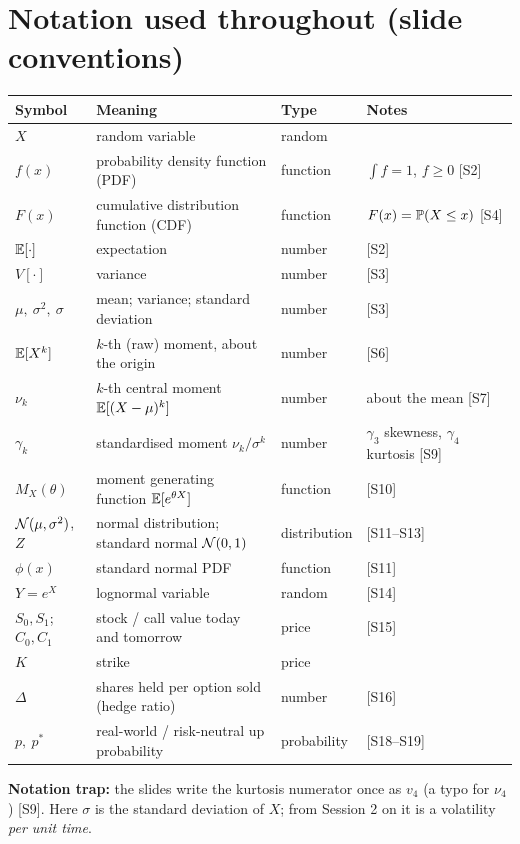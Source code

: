 \documentclass[10pt]{article}
\begin{document}
\section*{Notation used throughout (slide conventions)}
{\small\renewcommand{\arraystretch}{1.15}
\begin{tabularx}{\linewidth}{@{}l X l l@{}}\toprule
Symbol & Meaning & Type & Notes\\\midrule
$X$ & random variable & random & \\
$f(x)$ & probability density function (PDF) & function & $\int f=1$, $f\ge 0$ [S2]\\
$F(x)$ & cumulative distribution function (CDF) & function & $F(x)=\mathbb{P}(X\le x)$ [S4]\\
$\mathbb{E}[\cdot]$ & expectation & number & [S2]\\
$V[\cdot]$ & variance & number & [S3]\\
$\mu,\ \sigma^2,\ \sigma$ & mean; variance; standard deviation & number & [S3]\\
$\mathbb{E}[X^k]$ & $k$-th (raw) moment, about the origin & number & [S6]\\
$\nu_k$ & $k$-th central moment $\mathbb{E}[(X-\mu)^k]$ & number & about the mean [S7]\\
$\gamma_k$ & standardised moment $\nu_k/\sigma^k$ & number & $\gamma_3$ skewness, $\gamma_4$ kurtosis [S9]\\
$M_X(\theta)$ & moment generating function $\mathbb{E}[e^{\theta X}]$ & function & [S10]\\
$\mathcal{N}(\mu,\sigma^2)$, $Z$ & normal distribution; standard normal $\mathcal{N}(0,1)$ & distribution & [S11--S13]\\
$\phi(x)$ & standard normal PDF & function & [S11]\\
$Y=e^X$ & lognormal variable & random & [S14]\\
$S_0,S_1$; $C_0,C_1$ & stock / call value today and tomorrow & price & [S15]\\
$K$ & strike & price & \\
$\Delta$ & shares held per option sold (hedge ratio) & number & [S16]\\
$p,\ p^*$ & real-world / risk-neutral up probability & probability & [S18--S19]\\\bottomrule
\end{tabularx}}

\textbf{Notation trap:} the slides write the kurtosis numerator once as $v_4$ (a typo for $\nu_4$) [S9]. Here $\sigma$ is the standard deviation of $X$; from Session 2 on it is a volatility \emph{per unit time}.
\end{document}
